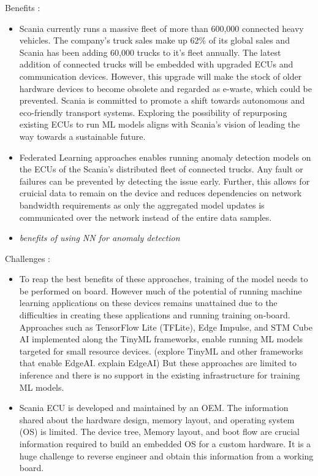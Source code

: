 Benefits :
\begin{itemize}
	\item Scania currently runs a massive fleet of more than 600,000 connected heavy vehicles. The company's truck sales make up 62\% of its global sales and Scania has been adding 60,000 trucks to it's fleet annually. The latest addition of connected trucks will be embedded with upgraded ECUs and communication devices. However, this upgrade will make the stock of older hardware devices to become obsolete and regarded as e-waste, which could be prevented. Scania is committed to promote a shift towards autonomous and eco-friendly transport systems. Exploring the possibility of repurposing existing ECUs to run ML models aligns with Scania's vision of leading the way towards a sustainable future.
	\item Federated Learning approaches enables running anomaly detection models on the ECUs of the Scania's distributed fleet of connected trucks. Any fault or failures can be prevented by detecting the issue early. Further, this allows for cruicial data to remain on the device and reduces dependencies on network bandwidth requirements as only the aggregated model updates is communicated over the network instead of the entire data samples.
	\item \textit{benefits of using NN for anomaly detection}
\end{itemize}

Challenges :
\begin{itemize}
	\item To reap the best benefits of these approaches, training of the model needs to be performed on board. However much of the potential of running machine learning applications on these devices remains unattained due to the difficulties in creating these applications and running training on-board. Approaches such as TensorFlow Lite (TFLite), Edge Impulse, and STM Cube AI implemented along the TinyML frameworks, enable running ML models targeted for small resource devices. (explore TinyML and other frameworks that enable EdgeAI. explain EdgeAI)	But these approaches are limited to inference and there is no support in the existing infrastructure for training ML models.

	\item Scania ECU is developed and maintained by an OEM. The information shared about the hardware design, memory layout, and operating system (OS) is limited. The device tree, Memory layout, and boot flow are crucial information required to build an embedded OS for a custom hardware. It is a huge challenge to reverse engineer and obtain this information from a working board.
\end{itemize}

